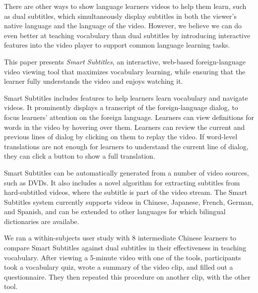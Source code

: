 \documentclass{sigchi}
\begin{document}
There are other ways to show language learners videos to help them learn,
such as dual subtitles,
which simultaneously display subtitles in both the viewer's native
language and the language of the video.
However, we believe we can do even better at teaching vocabulary
than dual subtitles
by introducing interactive features into the video player
to support common language learning tasks.

This paper presents \emph{Smart Subtitles}, an interactive, web-based
foreign-language video viewing tool
that maximizes vocabulary learning, while ensuring that the learner
fully understands the video and enjoys watching it.

Smart Subtitles includes features to help
learners learn vocabulary and navigate videos.
It prominently displays a transcript of the foreign-language dialog, to
focus learners' attention on the foreign language.
Learners can view definitions for words in the video by hovering over them.
Learners can review the current and previous lines of dialog by clicking on them to replay the video.
If word-level translations are not enough for learners to understand the
current line of dialog, they can click a button to show a full translation.

Smart Subtitles can be automatically generated from a number
of video sources, such as DVDs. It also includes a novel algorithm for
extracting subtitles from hard-subtitled videos, where the subtitle is
part of the video stream. The Smart Subtitles system currently supports videos in Chinese,
Japanese, French, German, and Spanish, and can be extended to other languages
for which bilingual dictionaries are availabe.

We ran a within-subjects user study with 8 intermediate Chinese learners to compare Smart Subtitles against dual subtitles in their effectiveness in teaching vocabulary. After viewing a 5-minute video with one of the tools, participants took a vocabulary quiz,
wrote a summary of the video clip,
and filled out a questionnaire. They then repeated this procedure on another clip, with the other tool.
\end{document}
